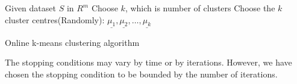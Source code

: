 \documentclass{article}
\begin{document}
\begin{algorithm}[H]
\SetAlgoLined
 Given dataset $S$ in $R^m$\;
 Choose $k$, which is number of clusters\;
 Choose the $k$ cluster centres(Randomly): $\underline{\mu_1}, \underline{\mu_2}, \dots, \underline{\mu_k}$\;
 \caption{Online k-means clustering algorithm}
\end{algorithm}

The stopping conditions may vary by time or by iterations. However, we have chosen the stopping condition to be bounded by the number of iterations.
\end{document}
